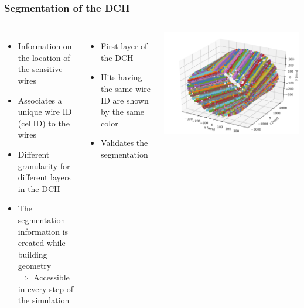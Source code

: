 \documentclass[aspectratio=169, hyperref={colorlinks=true,pdfpagelabels=false,linkcolor=black}, xcolor=dvipsnames,10pt]{beamer}
\begin{document}
\begin{frame}
	\frametitle{Segmentation of the DCH}
		
	\begin{columns}[t]
		\begin{itemize}
		\item Information on the location of the sensitive wires \vspace{0.2cm}
		\item Associates a unique wire ID (cellID) to the wires \vspace{0.2cm}
		\item Different granularity for different layers in the DCH \vspace{0.2cm}
		\item The segmentation information is created while building geometry \vspace{0.2cm} \\
			$\Rightarrow$ Accessible in every step of the simulation
		\end{itemize}
	
		\begin{itemize}
		\item First layer of the DCH
		\item Hits having the same wire ID are shown by the same color
		\item Validates the segmentation
		\end{itemize}
		\centering
		\includegraphics[width=\textwidth]{../figures/allHits}
	\end{columns}
	
\end{frame}
\end{document}

